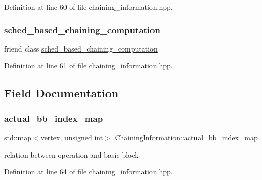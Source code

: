 Definition at line 60 of file chaining\+\_\+information.\+hpp.

\mbox{\label{classChainingInformation_a202bca3d51acbbaee5b99ea1fed96ad4}} 
\subsubsection{\texorpdfstring{sched\+\_\+based\+\_\+chaining\+\_\+computation}{sched\_based\_chaining\_computation}}
{\footnotesize\ttfamily friend class \hyperlink{classsched__based__chaining__computation}{sched\+\_\+based\+\_\+chaining\+\_\+computation}\hspace{0.3cm}{\ttfamily [friend]}}



Definition at line 61 of file chaining\+\_\+information.\+hpp.



\subsection{Field Documentation}
\mbox{\label{classChainingInformation_a2c097f4799285053ee13f55e6ad362e7}} 
\subsubsection{\texorpdfstring{actual\+\_\+bb\+\_\+index\+\_\+map}{actual\_bb\_index\_map}}
{\footnotesize\ttfamily std\+::map$<$\hyperlink{graph_8hpp_abefdcf0544e601805af44eca032cca14}{vertex}, unsigned int$>$ Chaining\+Information\+::actual\+\_\+bb\+\_\+index\+\_\+map\hspace{0.3cm}{\ttfamily [protected]}}



relation between operation and basic block 



Definition at line 64 of file chaining\+\_\+information.\+hpp.

